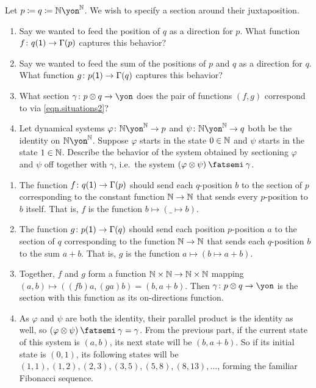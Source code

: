 \documentclass[Book-Poly]{subfiles}
\begin{document}
\begin{exercise}
Let $p\coloneqq q\coloneqq\nn\yon^\nn$.
We wish to specify a section around their juxtaposition.
\begin{enumerate}
  \item Say we wanted to feed the position of $q$ as a direction for $p$.
  What function $f\colon q(\textsf{1})\to\Gamma(p)$ captures this behavior?
  \item Say we wanted to feed the sum of the positions of $p$ and $q$ as a direction for $q$.
  What function $g\colon p(\textsf{1})\to\Gamma(q)$ captures this behavior?
  \item What section $\gamma\colon p\otimes q\to\yon$ does the pair of functions $(f,g)$ correspond to via \eqref{eqn.situations2}?
	\item Let dynamical systems $\varphi\colon\nn\yon^\nn\to p$ and $\psi\colon\nn\yon^\nn\to q$ both be the identity on $\nn\yon^\nn$.
	Suppose $\varphi$ starts in the state $0\in\mathbb{N}$ and $\psi$ starts in the state $1\in\mathbb{N}$.
	Describe the behavior of the system obtained by sectioning $\varphi$ and $\psi$ off together with $\gamma$, i.e.\ the system $(\varphi\otimes\psi)\then\gamma$.
\qedhere
\end{enumerate}
\begin{solution}
\begin{enumerate}
    \item The function $f\colon q(\textsf{1})\to\Gamma(p)$ should send each $q$-position $b$ to the section of $p$ corresponding to the constant function $\mathbb{N}\to\mathbb{N}$ that sends every $p$-position to $b$ itself.
    That is, $f$ is the function $b\mapsto(\_\mapsto b)$.
    \item The function $g\colon p(\textsf{1})\to\Gamma(q)$ should send each position $p$-position $a$ to the section of $q$ corresponding to the function $\mathbb{N}\to\mathbb{N}$ that sends each $q$-position $b$ to the sum $a+b$.
    That is, $g$ is the function $a\mapsto(b\mapsto a+b)$.
    \item Together, $f$ and $g$ form a function $\mathbb{N}\times\mathbb{N}\to\mathbb{N}\times\mathbb{N}$ mapping $(a,b)\mapsto((fb)a,(ga)b)=(b,a+b)$.
    Then $\gamma\colon p\otimes q\to\yon$ is the section with this function as its on-directions function.
    \item As $\varphi$ and $\psi$ are both the identity, their parallel product is the identity as well, so $(\varphi\otimes\psi)\then\gamma=\gamma$.
    From the previous part, if the current state of this system is $(a,b)$, its next state will be $(b,a+b)$.
    So if its initial state is $(0,1)$, its following states will be $(1,1),(1,2),(2,3),(3,5),(5,8),(8,13),\ldots$, forming the familiar Fibonacci sequence.
\end{enumerate}
\end{solution}
\end{exercise}
\end{document}
